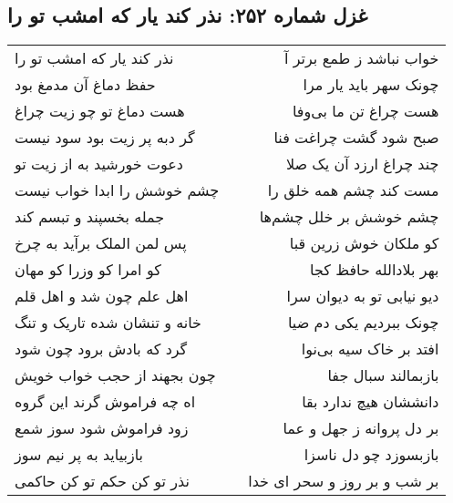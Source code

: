 \begin{center}
\section*{غزل شماره ۲۵۲: نذر کند یار که امشب تو را}
\label{sec:0252}
\begin{longtable}{l p{0.5cm} r}
نذر کند یار که امشب تو را
&&
خواب نباشد ز طمع برتر آ
\\
حفظ دماغ آن مدمغ بود
&&
چونک سهر باید یار مرا
\\
هست دماغ تو چو زیت چراغ
&&
هست چراغ تن ما بی‌وفا
\\
گر دبه پر زیت بود سود نیست
&&
صبح شود گشت چراغت فنا
\\
دعوت خورشید به از زیت تو
&&
چند چراغ ارزد آن یک صلا
\\
چشم خوشش را ابدا خواب نیست
&&
مست کند چشم همه خلق را
\\
جمله بخسپند و تبسم کند
&&
چشم خوشش بر خلل چشم‌ها
\\
پس لمن الملک برآید به چرخ
&&
کو ملکان خوش زرین قبا
\\
کو امرا کو وزرا کو مهان
&&
بهر بلادالله حافظ کجا
\\
اهل علم چون شد و اهل قلم
&&
دیو نیابی تو به دیوان سرا
\\
خانه و تنشان شده تاریک و تنگ
&&
چونک ببردیم یکی دم ضیا
\\
گرد که بادش برود چون شود
&&
افتد بر خاک سیه بی‌نوا
\\
چون بجهند از حجب خواب خویش
&&
بازبمالند سبال جفا
\\
اه چه فراموش گرند این گروه
&&
دانششان هیچ ندارد بقا
\\
زود فراموش شود سوز شمع
&&
بر دل پروانه ز جهل و عما
\\
بازبیاید به پر نیم سوز
&&
بازبسوزد چو دل ناسزا
\\
نذر تو کن حکم تو کن حاکمی
&&
بر شب و بر روز و سحر ای خدا
\\
\end{longtable}
\end{center}
